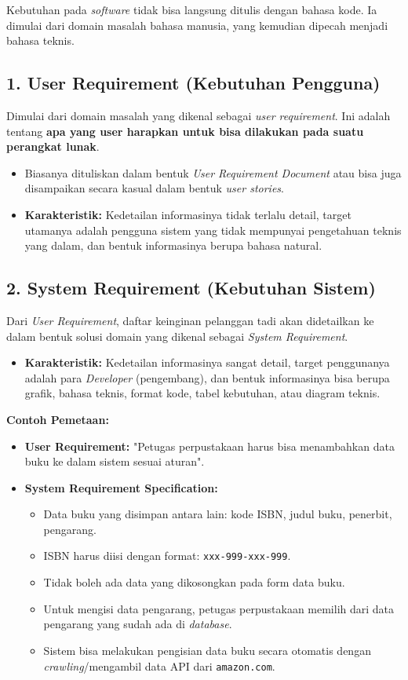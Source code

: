 \documentclass[12pt,a4paper]{article}
\begin{document}
Kebutuhan pada \textit{software} tidak bisa langsung ditulis dengan bahasa kode. Ia dimulai dari domain masalah bahasa manusia, yang kemudian dipecah menjadi bahasa teknis.

\subsection{1. User Requirement (Kebutuhan Pengguna)}
Dimulai dari domain masalah yang dikenal sebagai \textit{user requirement}. Ini adalah tentang \textbf{apa yang user harapkan untuk bisa dilakukan pada suatu perangkat lunak}. 
\begin{itemize}
    \item Biasanya dituliskan dalam bentuk \textit{User Requirement Document} atau bisa juga disampaikan secara kasual dalam bentuk \textit{user stories}.
    \item \textbf{Karakteristik:} Kedetailan informasinya tidak terlalu detail, target utamanya adalah pengguna sistem yang tidak mempunyai pengetahuan teknis yang dalam, dan bentuk informasinya berupa bahasa natural.
\end{itemize}

\subsection{2. System Requirement (Kebutuhan Sistem)}
Dari \textit{User Requirement}, daftar keinginan pelanggan tadi akan didetailkan ke dalam bentuk solusi domain yang dikenal sebagai \textit{System Requirement}. 
\begin{itemize}
    \item \textbf{Karakteristik:} Kedetailan informasinya sangat detail, target penggunanya adalah para \textit{Developer} (pengembang), dan bentuk informasinya bisa berupa grafik, bahasa teknis, format kode, tabel kebutuhan, atau diagram teknis.
\end{itemize}

\begin{notebox}
\textbf{Contoh Pemetaan:}
\begin{itemize}
    \item \textbf{User Requirement:} "Petugas perpustakaan harus bisa menambahkan data buku ke dalam sistem sesuai aturan".
    \item \textbf{System Requirement Specification:}
    \begin{itemize}
        \item Data buku yang disimpan antara lain: kode ISBN, judul buku, penerbit, pengarang.
        \item ISBN harus diisi dengan format: \texttt{xxx-999-xxx-999}.
        \item Tidak boleh ada data yang dikosongkan pada form data buku.
        \item Untuk mengisi data pengarang, petugas perpustakaan memilih dari data pengarang yang sudah ada di \textit{database}.
        \item Sistem bisa melakukan pengisian data buku secara otomatis dengan \textit{crawling}/mengambil data API dari \texttt{amazon.com}.
    \end{itemize}
\end{itemize}
\end{notebox}
\end{document}
